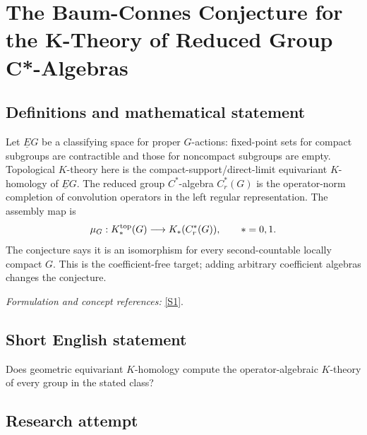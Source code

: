 \documentclass[11pt]{article}
\newcommand{\sref}[2]{\hyperlink{source:#1:#2}{[S#2]}}
\newif\ifshowcatalogue
\newcommand{\cataloguescope}[1]{\ifshowcatalogue
 \paragraph{Exact scope in the supplied catalogue.}
 \begin{quote}\small #1\end{quote}\fi}
\begin{document}
\setcounter{section}{52}
\clearpage
\section{\texorpdfstring{The Baum-Connes Conjecture for the K-Theory of Reduced Group C*-Algebras}{The Baum-Connes Conjecture for the K-Theory of Reduced Group C*-Algebras}}\label{53}
\subsection{Definitions and mathematical statement}
Let $\underline EG$ be a classifying space for proper $G$-actions: fixed-point sets for compact subgroups are contractible and those for noncompact subgroups are empty. Topological $K$-theory here is the compact-support/direct-limit equivariant $K$-homology of $\underline EG$. The reduced group $C^*$-algebra $C_r^*(G)$ is the operator-norm completion of convolution operators in the left regular representation. The assembly map is
\[
 \mu_G:K_*^{\rm top}(G)\longrightarrow K_*(C_r^*(G)),\qquad *=0,1.
\]
The conjecture says it is an isomorphism for every second-countable locally compact $G$. This is the coefficient-free target; adding arbitrary coefficient algebras changes the conjecture.
\par\smallskip\textit{Formulation and concept references:} \sref{53}{1}.
\cataloguescope{Prove the Baum-Connes conjecture for every second-countable locally compact group G: the assembly map K\_top(G) \ensuremath{\to} K(C*\_r(G)) from the topological K-theory of the group, built from the classifying space for proper actions, to the K-theory of the reduced group C*-algebra is an isomorphism.}
\subsection{Short English statement}
Does geometric equivariant $K$-homology compute the operator-algebraic $K$-theory of every group in the stated class?
\subsection{Research attempt}
\end{document}
